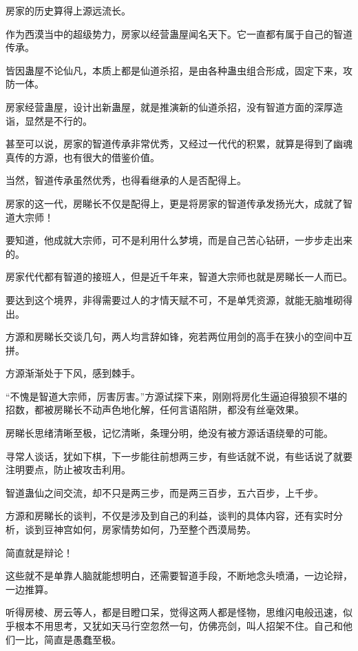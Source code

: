 
\begin{this_body}



房家的历史算得上源远流长。

作为西漠当中的超级势力，房家以经营蛊屋闻名天下。它一直都有属于自己的智道传承。

皆因蛊屋不论仙凡，本质上都是仙道杀招，是由各种蛊虫组合形成，固定下来，攻防一体。

房家经营蛊屋，设计出新蛊屋，就是推演新的仙道杀招，没有智道方面的深厚造诣，显然是不行的。

甚至可以说，房家的智道传承非常优秀，又经过一代代的积累，就算是得到了幽魂真传的方源，也有很大的借鉴价值。

当然，智道传承虽然优秀，也得看继承的人是否配得上。

房家的这一代，房睇长不仅是配得上，更是将房家的智道传承发扬光大，成就了智道大宗师！

要知道，他成就大宗师，可不是利用什么梦境，而是自己苦心钻研，一步步走出来的。

房家代代都有智道的接班人，但是近千年来，智道大宗师也就是房睇长一人而已。

要达到这个境界，非得需要过人的才情天赋不可，不是单凭资源，就能无脑堆砌得出。

方源和房睇长交谈几句，两人均言辞如锋，宛若两位用剑的高手在狭小的空间中互拼。

方源渐渐处于下风，感到棘手。

“不愧是智道大宗师，厉害厉害。”方源试探下来，刚刚将房化生逼迫得狼狈不堪的招数，都被房睇长不动声色地化解，任何言语陷阱，都没有丝毫效果。

房睇长思绪清晰至极，记忆清晰，条理分明，绝没有被方源话语绕晕的可能。

寻常人谈话，犹如下棋，下一步能往前想两三步，有些话就不说，有些话说了就要注明要点，防止被攻击利用。

智道蛊仙之间交流，却不只是两三步，而是两三百步，五六百步，上千步。

方源和房睇长的谈判，不仅是涉及到自己的利益，谈判的具体内容，还有实时分析，谈到豆神宫如何，房家情势如何，乃至整个西漠局势。

简直就是辩论！

这些就不是单靠人脑就能想明白，还需要智道手段，不断地念头喷涌，一边论辩，一边推算。

听得房棱、房云等人，都是目瞪口呆，觉得这两人都是怪物，思维闪电般迅速，似乎根本不用思考，又犹如天马行空忽然一句，仿佛亮剑，叫人招架不住。自己和他们一比，简直是愚蠢至极。


\end{this_body}
